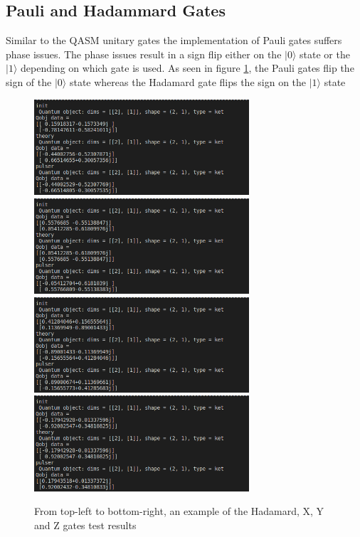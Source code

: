 \subsection{Pauli and Hadammard Gates}
Similar to the QASM unitary gates the implementation of Pauli gates suffers phase issues.
The phase issues result in a sign flip either on the $|0 \rangle$ state or the $|1 \rangle$ depending on which gate is used.
As seen in figure \ref{fig:HXYZ}, the Pauli gates flip the sign of the $|0 \rangle$ state whereas the Hadamard gate flips the sign on the $|1 \rangle$ state
\begin{figure}[H]
    \centering
    \includegraphics[width=80mm]{Images/H.png}\hfill
    \includegraphics[width=80mm]{Images/X.png}\hfill
    \includegraphics[width=80mm]{Images/Y.png}\hfill
    \includegraphics[width=80mm]{Images/Z.png}\hfill

    \caption{From top-left to bottom-right, an example of the Hadamard, X, Y and Z gates test results}
    \label{fig:HXYZ}
\end{figure}



